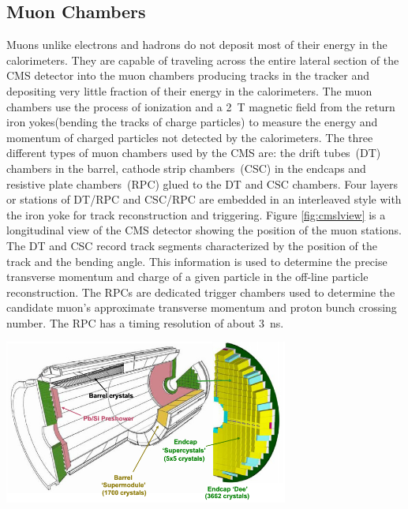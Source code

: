 \subsection{Muon Chambers}
Muons unlike electrons and hadrons do not deposit most of their energy in the calorimeters.
They are capable of traveling across the entire lateral section of the CMS detector into the muon chambers producing tracks in the tracker and depositing very little fraction of their energy in the calorimeters. 
The muon chambers use the process of ionization and a 2~T magnetic field from the return iron yokes(bending the tracks of charge particles) to measure the energy and momentum of charged particles not detected by the calorimeters.
The three different types of muon chambers used by the CMS are: the drift tubes~(DT) chambers in the barrel, cathode strip chambers~(CSC) 
in the endcaps and resistive plate chambers~(RPC) glued to the DT and CSC chambers.
Four layers or stations of DT/RPC and CSC/RPC are embedded in an interleaved  style with the iron yoke for track reconstruction and triggering. Figure \ref{fig:cmslview} is a longitudinal view of the CMS detector showing the position of the muon stations.
The DT and CSC record track segments characterized by the position of the track and the bending angle. This information is used to determine the precise transverse momentum and charge of a given particle in the  off-line particle reconstruction.
The RPCs are dedicated trigger chambers used to determine the candidate muon's approximate transverse momentum and proton bunch crossing number. The RPC has a timing resolution of about 3~ns.
\clearpage
\begin{center}
\centering
\mbox{\includegraphics[height= 0.5\textwidth, width=0.7\textwidth]{THESISPLOTS/CMS-ECAL-EB-EE.png}}
\label{fig:CMSECAL}
\end{center}

